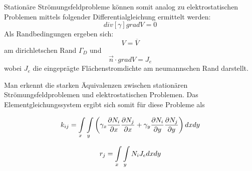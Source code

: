  Stationäre Strömungsfeldprobleme können somit analog zu elektrostatischen Problemen mittels folgender Differentialgleichung ermittelt werden:
 \begin{equation}
\mathit{div}[\gamma]\mathit{grad}V = 0
 \end{equation}
 Als Randbedingungen ergeben sich:
 \begin{equation}
 \label{eq:current_dirichlet_condition}
 V = \overline{V}
 \end{equation}
 am dirichletschen Rand $\Gamma_D$ und 
 \begin{equation}
 \label{eq:current_neumann_condition}
 \vec{n}\cdot\mathit{grad}V = J_e
 \end{equation}
 wobei $J_e$ die eingeprägte Flächenstromdichte am neumannschen Rand darstellt.\newline
 
 Man erkennt die starken Äquivalenzen zwischen stationären Strömungsfeldproblemen und elektrostatischen Problemen. Das Elementgleichungssystem ergibt sich somit für diese Probleme als
 
\begin{equation}
\label{eq:k_ij_stat_current}
k_{ij} = \int\displaylimits_{x} \int\displaylimits_{y} \left(\gamma_x \frac{\partial N_i}{\partial x}\frac{\partial N_j}{\partial x} +  \gamma_y\frac{\partial N_i}{\partial y}\frac{\partial N_j}{\partial y}\right)dx dy
\end{equation}

\begin{equation}
\label{eq:right_side_stat_current}
r_j = \int\displaylimits_{x} \int\displaylimits_{y} N_i J_e dx dy
\end{equation}


